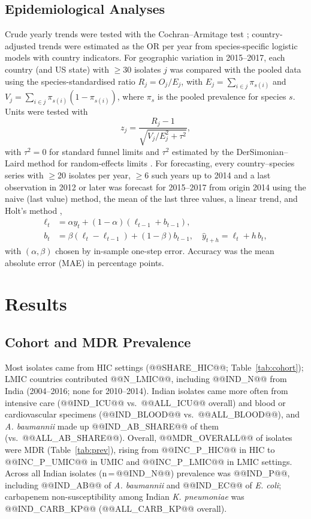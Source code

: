 \documentclass[conference]{IEEEtran}
\newcommand{\sci}[1]{\textit{#1}}
\begin{document}
\subsection{Epidemiological Analyses}\label{sec:epi}
Crude yearly trends were tested with the Cochran--Armitage test \cite{armitage1955}; country-adjusted trends were estimated as the OR per year from species-specific logistic models with country indicators. For geographic variation in 2015--2017, each country (and US state) with $\ge$30 isolates $j$ was compared with the pooled data using the species-standardised ratio $R_j=O_j/E_j$, with $E_j=\sum_{i\in j}\pi_{s(i)}$ and $V_j=\sum_{i\in j}\pi_{s(i)}(1-\pi_{s(i)})$, where $\pi_s$ is the pooled prevalence for species $s$. Units were tested with
\begin{equation}
z_j=\frac{R_j-1}{\sqrt{V_j/E_j^{2}+\tau^{2}}},
\label{eq:funnel}
\end{equation}
with $\tau^2=0$ for standard funnel limits and $\tau^2$ estimated by the DerSimonian--Laird method for random-effects limits \cite{spiegelhalter2005,dersimonian1986}. For forecasting, every country--species series with $\ge$20 isolates per year, $\ge$6 such years up to 2014 and a last observation in 2012 or later was forecast for 2015--2017 from origin 2014 using the naive (last value) method, the mean of the last three values, a linear trend, and Holt's method \cite{holt2004,hyndman2021},
\begin{equation}
\begin{aligned}
\ell_t&=\alpha y_t+(1-\alpha)(\ell_{t-1}+b_{t-1}),\\
b_t&=\beta(\ell_t-\ell_{t-1})+(1-\beta)b_{t-1},\quad \hat{y}_{t+h}=\ell_t+h\,b_t,
\end{aligned}
\label{eq:holt}
\end{equation}
with $(\alpha,\beta)$ chosen by in-sample one-step error. Accuracy was the mean absolute error (MAE) in percentage points.

\section{Results}\label{sec:results}
\subsection{Cohort and MDR Prevalence}\label{sec:cohort}
Most isolates came from HIC settings (@@SHARE_HIC@@; Table~\ref{tab:cohort}); LMIC countries contributed @@N_LMIC@@, including @@IND_N@@ from India (2004--2016; none for 2010--2014). Indian isolates came more often from intensive care (@@IND_ICU@@ vs.\ @@ALL_ICU@@ overall) and blood or cardiovascular specimens (@@IND_BLOOD@@ vs.\ @@ALL_BLOOD@@), and \sci{A. baumannii} made up @@IND_AB_SHARE@@ of them (vs.\ @@ALL_AB_SHARE@@). Overall, @@MDR_OVERALL@@ of isolates were MDR (Table~\ref{tab:prev}), rising from @@INC_P_HIC@@ in HIC to @@INC_P_UMIC@@ in UMIC and @@INC_P_LMIC@@ in LMIC settings. Across all Indian isolates (n\,=\,@@IND_N@@) prevalence was @@IND_P@@, including @@IND_AB@@ of \sci{A. baumannii} and @@IND_EC@@ of \sci{E. coli}; carbapenem non-susceptibility among Indian \sci{K. pneumoniae} was @@IND_CARB_KP@@ (@@ALL_CARB_KP@@ overall).
\end{document}
